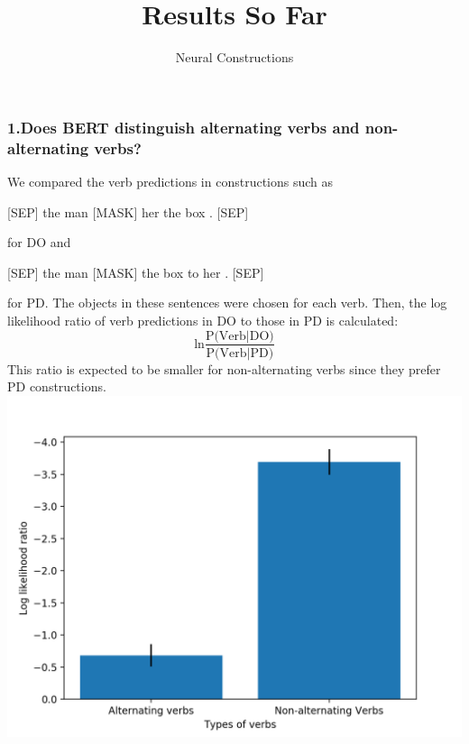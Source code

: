 \documentclass[twocolumn,dvipdfmx, 10pt]{article}
\begin{document}
\title{Results So Far}
\author{Neural Constructions}
\date{}
\maketitle
\thispagestyle{empty}
\subsubsection*{1.Does BERT distinguish alternating verbs and non-alternating verbs?}
We compared the verb predictions in constructions such as
\begin{center}
[SEP] the man [MASK] her the box . [SEP]
\end{center}
for DO and
\begin{center}
[SEP] the man [MASK] the box to her . [SEP]
\end{center}
for PD. The objects in these sentences were chosen for each verb.  Then, the log likelihood ratio of verb predictions in DO to those in PD is calculated:
$$\text{ln}\frac{\text{P(Verb} | \text{DO)}}{\text{P(Verb} | \text{PD)}}$$
 This ratio is expected to be smaller for non-alternating verbs since they prefer PD constructions.\\
\includegraphics[keepaspectratio,width = \linewidth]{BERT.png}
\end{document}

